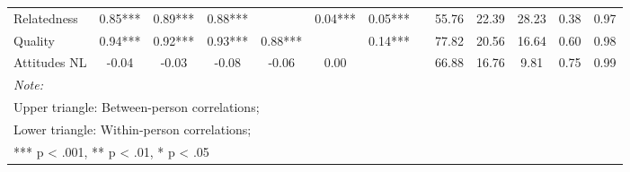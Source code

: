 \begin{table}
\begin{minipage}[t][\textheight][t]{\textwidth}
{\begin{tabular}[t]{lcccccccccccc}
\hspace{1em}Relatedness & 0.85*** & 0.89*** & 0.88*** &  & 0.04*** & 0.05*** &  & 55.76 & 22.39 & 28.23 & 0.38 & 0.97\\
\hspace{1em}Quality & 0.94*** & 0.92*** & 0.93*** & 0.88*** &  & 0.14*** &  & 77.82 & 20.56 & 16.64 & 0.60 & 0.98\\
\hspace{1em}Attitudes NL & -0.04 & -0.03 & -0.08 & -0.06 & 0.00 &  &  & 66.88 & 16.76 & 9.81 & 0.75 & 0.99\\
\bottomrule
\multicolumn{13}{l}{\rule{0pt}{1em}\textit{Note: }}\\
\multicolumn{13}{l}{\rule{0pt}{1em}Upper triangle: Between-person correlations;}\\
\multicolumn{13}{l}{\rule{0pt}{1em}Lower triangle: Within-person correlations;}\\
\multicolumn{13}{l}{\rule{0pt}{1em}*** p < .001, ** p < .01,  * p < .05}\\
\end{tabular}}
\end{minipage}
\end{table}
